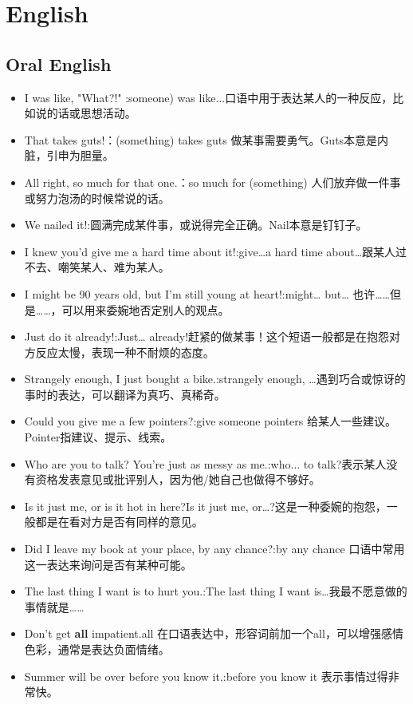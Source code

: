 \section{English}
\subsection{Oral English}
\begin{itemize}
  \item I was like, "What?!" :someone) was like...口语中用于表达某人的一种反应，比如说的话或思想活动。
  \item That takes guts!：(something) takes guts 做某事需要勇气。Guts本意是内脏，引申为胆量。
  \item All right, so much for that one.：so much for (something) 人们放弃做一件事或努力泡汤的时候常说的话。
  \item We nailed it!:圆满完成某件事，或说得完全正确。Nail本意是钉钉子。
  \item I knew you'd give me a hard time about it!:give…a hard time about…跟某人过不去、嘲笑某人、难为某人。
  \item I might be 90 years old, but I'm still young at heart!:might… but… 也许……但是……，可以用来委婉地否定别人的观点。
  \item Just do it already!:Just… already!赶紧的做某事！这个短语一般都是在抱怨对方反应太慢，表现一种不耐烦的态度。
  \item Strangely enough, I just bought a bike.:strangely enough, …遇到巧合或惊讶的事时的表达，可以翻译为真巧、真稀奇。
  \item Could you give me a few pointers?:give someone pointers 给某人一些建议。Pointer指建议、提示、线索。
  \item Who are you to talk? You’re just as messy as me.:who... to talk?表示某人没有资格发表意见或批评别人，因为他/她自己也做得不够好。
  \item Is it just me, or is it hot in here?Is it just me, or…?这是一种委婉的抱怨，一般都是在看对方是否有同样的意见。
  \item Did I leave my book at your place, by any chance?:by any chance 口语中常用这一表达来询问是否有某种可能。
  \item The last thing I want is to hurt you.:The last thing I want is…我最不愿意做的事情就是……
  \item Don't get \textbf{all} impatient.all 在口语表达中，形容词前加一个all，可以增强感情色彩，通常是表达负面情绪。
  \item Summer will be over before you know it.:before you know it 表示事情过得非常快。

\end{itemize}
